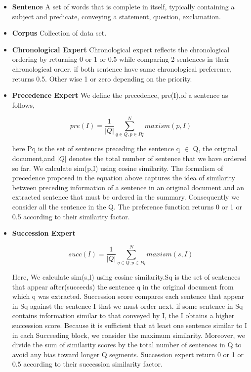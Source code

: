 \begin{itemize}
\item \textbf{Sentence} \newline
A set of words that is complete in itself, typically containing a subject and predicate, conveying a statement, question, exclamation.

\item \textbf{Corpus} \newline
Collection of data set.


\item \textbf{Chronological Expert} \newline
Chronological expert reflects the chronological ordering by returning 0 or 1 or 0.5 while comparing 2 sentences in their chronological order. if both sentence have same chronological preference, returns 0.5. Other wise 1 or zero depending on the priority.

\item \textbf{Precedence Expert} \newline
We define the precedence, pre(I),of a sentence as follows,
\begin{center}
\begin{equation}
pre(I) = \frac{1}{|Q|}\sum_{q \in Q, p \in Pq}^{N} maxism(p,I)
\end{equation}
\end{center}
here Pq is the set of sentences preceding the sentence q $\in$ Q, the original document,and $|Q|$ denotes the total number of sentence that we have ordered so far. We calculate sim(p,I) using cosine similarity. The formalism of precedence proposed in the equation above captures the idea of similarity between preceding information of a sentence in an original document and an extracted sentence that must be ordered in the summary. Consequently we consider all the sentence in the Q. The preference function returns 0 or 1 or 0.5 according to their similarity factor.
\item \textbf{Succession Expert} \newline
\begin{center}
\begin{equation}
succ(I) = \frac{1}{|Q|}\sum_{q \in Q, p \in Pq}^{N} maxism(s,I)
\end{equation}
\end{center}
Here, We calculate sim(s,I) using cosine similarity.Sq is the set of sentences that appear after(succeeds) the sentence q in the original document from which q was extracted. Succession score compares each sentence that appear in Sq against the sentence I that we must order next. if some sentence in Sq contains information similar to that conveyed by I, the I obtains a higher succession score. Because it is sufficient that at least one sentence similar to I in each Succeeding block, we consider the maximum similarity. Moreover, we divide the sum of similarity scores by the total number of sentences in Q to avoid any bias toward longer Q segments. Succession expert return 0 or 1 or 0.5 according to their succession similarity factor.


\end{itemize}
